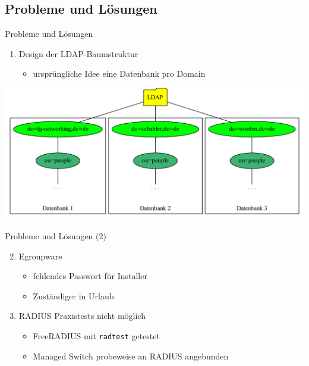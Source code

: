 \documentclass[presentation,svgnames,12pt]{beamer}
\begin{document}
\subsection{Probleme und Lösungen}
\begin{frame}{Probleme und Lösungen}
\begin{enumerate}
	\item Design der LDAP-Baumstruktur
	\vspace{6pt}
	\begin{itemize}
		\item ursprüngliche Idee eine Datenbank pro Domain%
	\end{itemize}
\end{enumerate}
\vspace{2pt}
\centering
\includegraphics[width=\textwidth]{Bilder/LDAP-fgn-planned.pdf}
\end{frame}

\begin{frame}{Probleme und Lösungen (2)}
\begin{enumerate}
	\setcounter{enumi}{1}
	\item Egroupware
	\vspace{6pt}
	\begin{itemize}
		\item fehlendes Passwort für Installer
		\item Zuständiger in Urlaub
	\end{itemize}
	\medskip
	\item RADIUS Praxistests nicht möglich
	\vspace{6pt}
	\begin{itemize}
		\item FreeRADIUS mit \texttt{radtest} getestet%
		\item Managed Switch probeweise an RADIUS angebunden
	\end{itemize}
\end{enumerate}
\end{frame}
\end{document}
